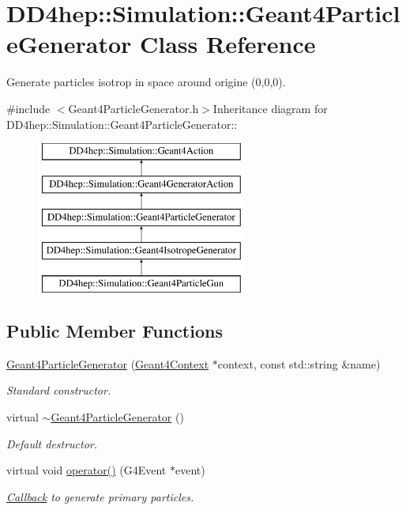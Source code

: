 \hypertarget{class_d_d4hep_1_1_simulation_1_1_geant4_particle_generator}{
\section{DD4hep::Simulation::Geant4ParticleGenerator Class Reference}
\label{class_d_d4hep_1_1_simulation_1_1_geant4_particle_generator}
}


Generate particles isotrop in space around origine (0,0,0).  


{\ttfamily \#include $<$Geant4ParticleGenerator.h$>$}Inheritance diagram for DD4hep::Simulation::Geant4ParticleGenerator::\begin{figure}[H]
\begin{center}
\leavevmode
\includegraphics[height=5cm]{class_d_d4hep_1_1_simulation_1_1_geant4_particle_generator}
\end{center}
\end{figure}
\subsection*{Public Member Functions}
\begin{DoxyCompactItemize}
\item 
\hyperlink{class_d_d4hep_1_1_simulation_1_1_geant4_particle_generator_a2342c285b4e25be8f39c4759a3ad5b29}{Geant4ParticleGenerator} (\hyperlink{class_d_d4hep_1_1_simulation_1_1_geant4_context}{Geant4Context} $\ast$context, const std::string \&name)
\begin{DoxyCompactList}\small\item\em Standard constructor. \item\end{DoxyCompactList}\item 
virtual \hyperlink{class_d_d4hep_1_1_simulation_1_1_geant4_particle_generator_a4fdb46f784ede918c2970e260e2fe218}{$\sim$Geant4ParticleGenerator} ()
\begin{DoxyCompactList}\small\item\em Default destructor. \item\end{DoxyCompactList}\item 
virtual void \hyperlink{class_d_d4hep_1_1_simulation_1_1_geant4_particle_generator_a4b7c8fdbc6fdc0c79efdf112c8ede315}{operator()} (G4Event $\ast$event)
\begin{DoxyCompactList}\small\item\em \hyperlink{class_d_d4hep_1_1_callback}{Callback} to generate primary particles. \item\end{DoxyCompactList}\end{DoxyCompactItemize}
